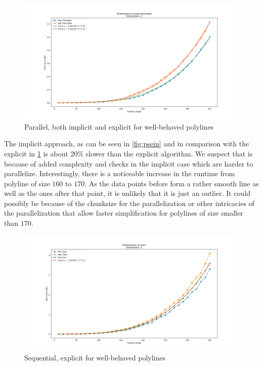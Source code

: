 \begin{figure}[ht]
  \centering
  \includegraphics[scale=0.5, width=\linewidth]{figures/psen-psein.png}
  \caption{Parallel, both implicit and explicit for well-behaved polylines}
  \label{fig:psen-psein}
\end{figure}

The implicit approach, as can be seen in \cref{fig:psein} and in comparison with the explicit in \cref{fig:psen-psein} is about 20\% slower than the explicit algorithm. We suspect that is because of added complexity and checks in the implicit case which are harder to parallelize. Interestingly, there is a noticeable increase in the runtime from polyline of size \(160\) to \(170\). As the data points before form a rather smooth line as well as the ones after that point, it is unlikely that it is just an outlier. It could possibly be because of the chunksize for the parallelization or other intricacies of the parallelization that allow faster simplification for polylines of size smaller than \(170\).

\begin{figure}[ht]
  \centering
  \includegraphics[scale=0.5, width=\linewidth]{figures/ssein.png}
  \caption{Sequential, explicit for well-behaved polylines}
  \label{fig:ssen}
\end{figure}

